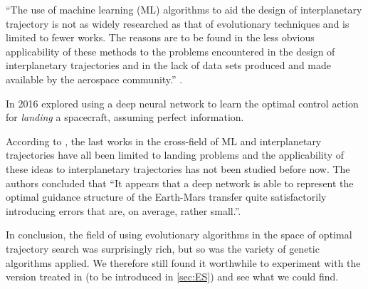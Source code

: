 ``The use of machine learning (ML) algorithms to aid the design of interplanetary trajectory is not as widely researched as that of evolutionary techniques and is limited to fewer works. The reasons are to be found in the less obvious applicability of these methods to the problems encountered in the design of interplanetary trajectories and in the lack of data sets produced and made available by the aerospace community.'' \cite{Izzo2018}.

In 2016 \cite{Sanchez-Sanchez2016} explored using a deep neural network to learn the optimal control action for \emph{landing} a spacecraft, assuming perfect information. 

According to \cite{Izzo2018}, the last works in the cross-field of ML and interplanetary trajectories have all been limited to landing problems and the applicability of these ideas to interplanetary trajectories has not been studied before now. The authors concluded that ``It appears that a deep network is able to represent the optimal guidance structure of the Earth-Mars transfer quite satisfactorily introducing errors that are, on average, rather small.''.

In conclusion, the field of using evolutionary algorithms in the space of optimal trajectory search was surprisingly rich, but so was the variety of genetic algorithms applied. We therefore still found it worthwhile to experiment with the version treated in \cite{Salimans2017} (to be introduced in \cref{sec:ES}) and see what we could find.